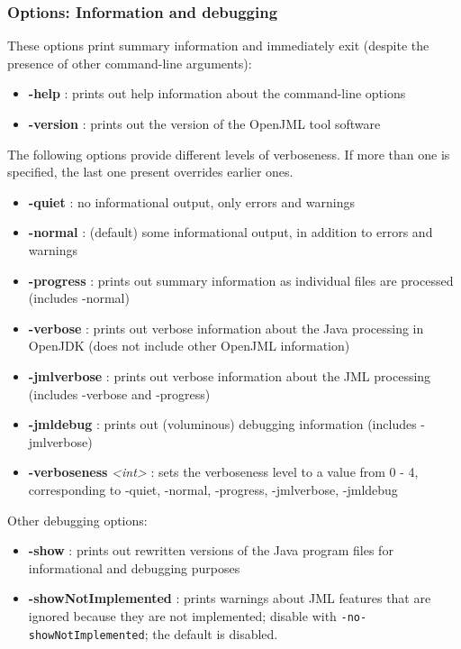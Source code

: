 \subsubsection{Options: Information and debugging}
\label{OptionsDebugging}
These options print summary information and immediately exit (despite the presence of other command-line arguments):
\begin{itemize}
\item \textbf{-help} : prints out help information about the command-line options
\item \textbf{-version} : prints out the version of the OpenJML tool software
\end{itemize}
The following options provide different levels of verboseness. If more than one is specified, the last one present overrides earlier ones.
\begin{itemize}
\item \textbf{-quiet} : no informational output, only errors and warnings
\item \textbf{-normal} : (default) some informational output, in addition to errors and warnings
\item \textbf{-progress} : prints out summary information as individual files are processed (includes -normal)
\item \textbf{-verbose} : prints out verbose information about the Java processing in OpenJDK (does not include other OpenJML information)
\item \textbf{-jmlverbose} : prints out verbose information about the JML processing (includes -verbose and -progress)
\item \textbf{-jmldebug} : prints out (voluminous) debugging information (includes -jmlverbose)
\item \textbf{-verboseness} {\it <int>} : sets the verboseness level to a value from 0 - 4, corresponding to -quiet, -normal, -progress, -jmlverbose, -jmldebug
\end{itemize}

Other debugging options:
\begin{itemize}
\item \textbf{-show} : prints out rewritten versions of the Java program files for informational and debugging purposes
\item \textbf{-showNotImplemented} : prints warnings about JML features that are ignored because they are not implemented; 
disable with \texttt{-no-showNotImplemented}; the default is disabled.
\end{itemize}

